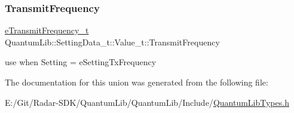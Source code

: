 \subsubsection{\texorpdfstring{Transmit\+Frequency}{TransmitFrequency}}
{\footnotesize\ttfamily \mbox{\hyperlink{namespace_quantum_lib_af636ea7f14f5a62bfcfc1132c9c78019}{e\+Transmit\+Frequency\+\_\+t}} Quantum\+Lib\+::\+Setting\+Data\+\_\+t\+::\+Value\+\_\+t\+::\+Transmit\+Frequency}



use when \textquotesingle{}Setting\textquotesingle{} = e\+Setting\+Tx\+Frequency 



The documentation for this union was generated from the following file\+:\begin{DoxyCompactItemize}
\item 
E\+:/\+Git/\+Radar-\/\+S\+D\+K/\+Quantum\+Lib/\+Quantum\+Lib/\+Include/\mbox{\hyperlink{_quantum_lib_types_8h}{Quantum\+Lib\+Types.\+h}}\end{DoxyCompactItemize}
